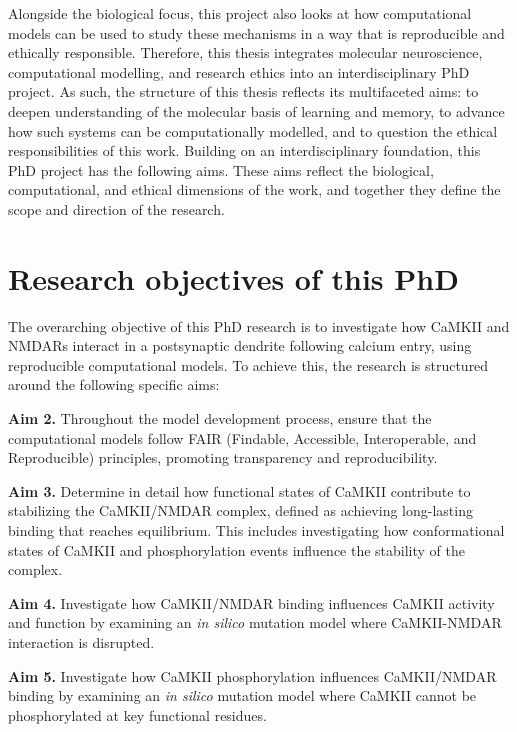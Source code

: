 \documentclass[
  11pt,
  letterpaper,
]{scrreprt}
\begin{document}
Alongside the biological focus, this project also looks at how
computational models can be used to study these mechanisms in a way that
is reproducible and ethically responsible. Therefore, this thesis
integrates molecular neuroscience, computational modelling, and research
ethics into an interdisciplinary PhD project. As such, the structure of
this thesis reflects its multifaceted aims: to deepen understanding of
the molecular basis of learning and memory, to advance how such systems
can be computationally modelled, and to question the ethical
responsibilities of this work. Building on an interdisciplinary
foundation, this PhD project has the following aims. These aims reflect
the biological, computational, and ethical dimensions of the work, and
together they define the scope and direction of the research.

\section*{Research objectives of this
PhD}\label{research-objectives-of-this-phd}


The overarching objective of this PhD research is to investigate how
CaMKII and NMDARs interact in a postsynaptic dendrite following calcium
entry, using reproducible computational models. To achieve this, the
research is structured around the following specific aims:


\textbf{Aim 2.} Throughout the model development process, ensure that
the computational models follow FAIR (Findable, Accessible,
Interoperable, and Reproducible) principles, promoting transparency and
reproducibility.

\textbf{Aim 3.} Determine in detail how functional states of CaMKII
contribute to stabilizing the CaMKII/NMDAR complex, defined as achieving
long-lasting binding that reaches equilibrium. This includes
investigating how conformational states of CaMKII and phosphorylation
events influence the stability of the complex.

\textbf{Aim 4.} Investigate how CaMKII/NMDAR binding influences CaMKII
activity and function by examining an \emph{in silico} mutation model
where CaMKII-NMDAR interaction is disrupted.

\textbf{Aim 5.} Investigate how CaMKII phosphorylation influences
CaMKII/NMDAR binding by examining an \emph{in silico} mutation model
where CaMKII cannot be phosphorylated at key functional residues.
\end{document}
